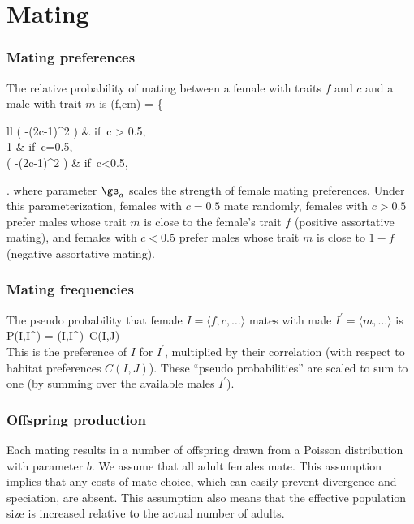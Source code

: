 \documentclass{article}
\begin{document}
\section{Mating}

\subsubsection{Mating preferences}

The relative probability of mating between a
female with traits $f$ and $c$ and a male with trait $m$ is
	\be  \label{pref}
	\psi(f,c\mid m) =  \left\{ \begin{array}{ll}
                         \exp \left( -(2c-1)^2 \right) & \mbox{if}\ c > 0.5, \\
			  1 & \mbox{if}\ c=0.5,\\
                         \exp \left( -(2c-1)^2 \right) & \mbox{if}\ c<0.5,
                      \end{array} \right.
	\ee
where parameter $\gs_a$ scales the strength of female mating preferences. Under this parameterization,
females with $c=0.5$ mate randomly, females with $c>0.5$ prefer males whose trait $m$ is close to 
the female's trait $f$ (positive assortative mating), and females with $c<0.5$ prefer males whose 
trait $m$ is close to $1-f$ (negative assortative mating). 


\subsubsection{Mating frequencies}

The pseudo probability that female
$I = \langle f,c,\ldots \rangle$ mates with male $I^{\prime}= \langle m,\ldots \rangle$ is
\be
P(I,I^{\prime}) = \psi(I,I^{\prime})\ C(I,J) \\
\ee
This is the preference of $I$ for $I^{\prime}$, multiplied by their
correlation (with respect to habitat preferences $C(I,J)$).  These ``pseudo
probabilities'' are scaled to sum to one (by summing over the available males $I^\prime$).


\subsubsection{Offspring production}

Each mating results in a number of offspring drawn from a Poisson distribution with parameter $b$.
We assume that all adult females mate. This assumption implies that any costs of mate choice,
which can easily prevent divergence and speciation, are absent.
This assumption also means that the effective population size is increased relative to the actual
number of adults. 
\end{document}
